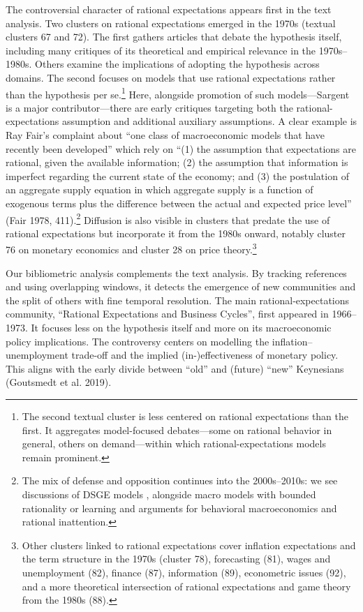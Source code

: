 \documentclass[
]{interact}
\begin{document}
The controversial character of rational expectations appears first in
the text analysis. Two clusters on rational expectations emerged in the
1970s (textual clusters 67 and 72). The first gathers articles that
debate the hypothesis itself, including many critiques of its
theoretical and empirical relevance in the 1970s--1980s. Others examine
the implications of adopting the hypothesis across domains. The second
focuses on models that use rational expectations rather than the
hypothesis per se.\footnote{The second textual cluster is less centered
  on rational expectations than the first. It aggregates model-focused
  debates---some on rational behavior in general, others on
  demand---within which rational-expectations models remain prominent.}
Here, alongside promotion of such models---Sargent is a major
contributor---there are early critiques targeting both the
rational-expectations assumption and additional auxiliary assumptions. A
clear example is Ray Fair's complaint about ``one class of macroeconomic
models that have recently been developed'' which rely on ``(1) the
assumption that expectations are rational, given the available
information; (2) the assumption that information is imperfect regarding
the current state of the economy; and (3) the postulation of an
aggregate supply equation in which aggregate supply is a function of
exogenous terms plus the difference between the actual and expected
price level'' (Fair 1978, 411).\footnote{The mix of defense and
  opposition continues into the 2000s--2010s: we see discussions of DSGE
  models , alongside macro models with bounded rationality or learning
  and arguments for behavioral macroeconomics and rational inattention.}
Diffusion is also visible in clusters that predate the use of rational
expectations but incorporate it from the 1980s onward, notably cluster
76 on monetary economics and cluster 28 on price theory.\footnote{Other
  clusters linked to rational expectations cover inflation expectations
  and the term structure in the 1970s (cluster 78), forecasting (81),
  wages and unemployment (82), finance (87), information (89),
  econometric issues (92), and a more theoretical intersection of
  rational expectations and game theory from the 1980s (88).}

Our bibliometric analysis complements the text analysis. By tracking
references and using overlapping windows, it detects the emergence of
new communities and the split of others with fine temporal resolution.
The main rational‐expectations community, ``Rational Expectations and
Business Cycles'', first appeared in 1966--1973. It focuses less on the
hypothesis itself and more on its macroeconomic policy implications. The
controversy centers on modelling the inflation--unemployment trade-off
and the implied (in-)effectiveness of monetary policy. This aligns with
the early divide between ``old'' and (future) ``new'' Keynesians
(Goutsmedt et al. 2019).
\end{document}
